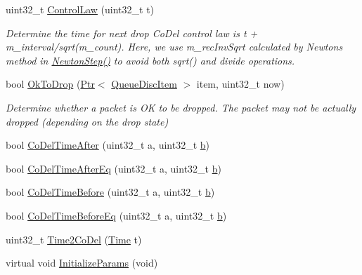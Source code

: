 \begin{DoxyCompactItemize}
uint32\+\_\+t \hyperlink{classns3_1_1CoDelQueueDisc_adff5ff4ecef4f9bbe51cde7ab0642af3}{Control\+Law} (uint32\+\_\+t t)
\begin{DoxyCompactList}\small\item\em Determine the time for next drop Co\+Del control law is t + m\+\_\+interval/sqrt(m\+\_\+count). Here, we use m\+\_\+rec\+Inv\+Sqrt calculated by Newton\textquotesingle{}s method in \hyperlink{classns3_1_1CoDelQueueDisc_acca9bb0949833fbd55afe6591d017e18}{Newton\+Step()} to avoid both sqrt() and divide operations. \end{DoxyCompactList}\item 
bool \hyperlink{classns3_1_1CoDelQueueDisc_a9b3e4ad53210fe2b1098fc799e139ff0}{Ok\+To\+Drop} (\hyperlink{classns3_1_1Ptr}{Ptr}$<$ \hyperlink{classns3_1_1QueueDiscItem}{Queue\+Disc\+Item} $>$ item, uint32\+\_\+t now)
\begin{DoxyCompactList}\small\item\em Determine whether a packet is OK to be dropped. The packet may not be actually dropped (depending on the drop state) \end{DoxyCompactList}\item 
bool \hyperlink{classns3_1_1CoDelQueueDisc_aea796cf37c4eb54d18991a60350629ce}{Co\+Del\+Time\+After} (uint32\+\_\+t a, uint32\+\_\+t \hyperlink{lte__pathloss_8m_a21ad0bd836b90d08f4cf640b4c298e7c}{b})
\item 
bool \hyperlink{classns3_1_1CoDelQueueDisc_a5b022a23de13e1ac587488136756b86a}{Co\+Del\+Time\+After\+Eq} (uint32\+\_\+t a, uint32\+\_\+t \hyperlink{lte__pathloss_8m_a21ad0bd836b90d08f4cf640b4c298e7c}{b})
\item 
bool \hyperlink{classns3_1_1CoDelQueueDisc_aeb986db9ac673c2eb4f5ead515edfe43}{Co\+Del\+Time\+Before} (uint32\+\_\+t a, uint32\+\_\+t \hyperlink{lte__pathloss_8m_a21ad0bd836b90d08f4cf640b4c298e7c}{b})
\item 
bool \hyperlink{classns3_1_1CoDelQueueDisc_a34c78ce4801cace99182de35b41c4022}{Co\+Del\+Time\+Before\+Eq} (uint32\+\_\+t a, uint32\+\_\+t \hyperlink{lte__pathloss_8m_a21ad0bd836b90d08f4cf640b4c298e7c}{b})
\item 
uint32\+\_\+t \hyperlink{classns3_1_1CoDelQueueDisc_aba2aa3ab9d1adecc1b60023512656972}{Time2\+Co\+Del} (\hyperlink{classns3_1_1Time}{Time} t)
\item 
virtual void \hyperlink{classns3_1_1CoDelQueueDisc_a080a75b9680b67884cebc6fb429c0b95}{Initialize\+Params} (void)
\end{DoxyCompactItemize}

